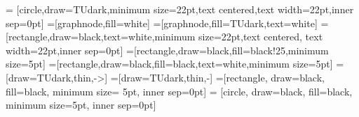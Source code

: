 \newcommand{\independent}{\perp\mkern-9.5mu\perp}
\newcommand{\notindependent}{\centernot{\independent}}

\newcommand{\q}{\quad}
\newcommand{\qq}{\qquad}
\newcommand{\qqq}{\quad\qquad}
\newcommand{\qqqq}{\qquad\qquad}

\usepackage[e]{esvect} %

\renewcommand{\vec}{\boldsymbol} 
\newcommand{\fun}[1]{\mathsf{#1}}
\newcommand{\vect}[1]{\vv{#1}}
\renewcommand{\O}{\mathcal{O}}
\newcommand{\GP}{\mathcal{GP}}
\newcommand{\Id}{I} 
\newcommand{\II}{\mathbb{I}}

\makeatletter
\newcommand{\superimpose}[2]{%
  {\ooalign{$#1\@firstoftwo#2$\cr\hfil$#1\@secondoftwo#2$\hfil\cr}}}
\makeatother
\newcommand{\ostimes}{\mathpalette\superimpose{{\otimes}{\ominus}}}
\newcommand{\oatimes}{\mathpalette\superimpose{{\otimes}{\obar}}}

\DeclareMathOperator*{\sumint}{\mathpalette\superimpose{{\int}{\sum}}}

\newcommand{\y}{\vec{y}}
\newcommand{\x}{\vec{x}}
\newcommand{\X}{\vec{X}}
\newcommand{\bX}{\mathbb{X}}
\newcommand{\const}{\mathrm{const.}}

\newcommand{\up}{\textasciicircum}


\usetikzlibrary{arrows,shapes,plotmarks,decorations.pathmorphing}
\usetikzlibrary{backgrounds,calc,positioning,fadings}

\tikzset{>=stealth'} 
 = 
   [circle,draw=TUdark,minimum size=22pt,text centered,text
     width=22pt,inner sep=0pt] 
   =[graphnode,fill=white]
   =[graphnode,fill=TUdark,text=white]
   =[rectangle,draw=black,text=white,minimum
size=22pt,text centered, text width=22pt,inner sep=0pt]
   =[rectangle,draw=black,fill=black!25,minimum size=5pt]
 =[rectangle,draw=black,fill=black,text=white,minimum size=5pt]
  =[draw=TUdark,thin,->]
  =[draw=TUdark,thin,-]
 =[rectangle, draw=black, fill=black, minimum size=
5pt, inner sep=0pt]
 = [circle, draw=black, fill=black, minimum
size=5pt, inner sep=0pt]

\tikzfading[name=fade top,bottom color=transparent!0,top color=transparent!75]

\DeclareMathSymbol\leftarrowtriangle{}
\DeclareMathSymbol\rightarrowtriangle{}
\DeclareMathSymbol\sslash{}
\DeclareMathSymbol\obar{}
\DeclareMathSymbol\otimes{}
\DeclareMathSymbol\ominus{}
\DeclareMathSymbol\minuso{}
\renewcommand{\gets}{\operatorname*{\leftarrowtriangle}}
\renewcommand{\to}{\operatorname*{\rightarrowtriangle}}

